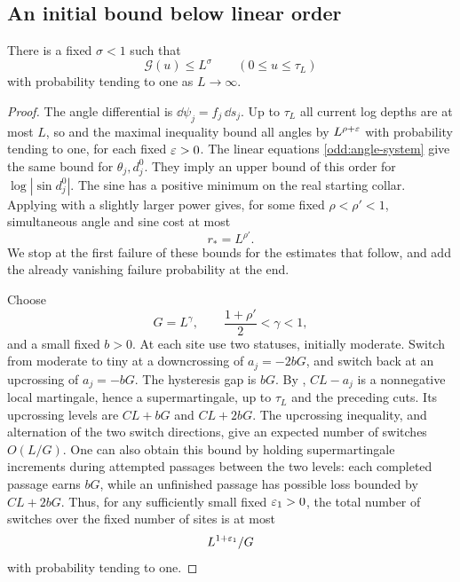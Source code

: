\subsection{An initial bound below linear order}

\begin{lemma}
\label{odd:initial-geometry}
There is a fixed \(\sigma<1\) such that
\[
 \mathcal G(u)\le L^\sigma\qquad(0\le u\le\tau_L)
\]
with probability tending to one as \(L\to\infty\).
\end{lemma}

\begin{proof}
The angle differential is \(\dd\psi_j=f_j\,\dd s_j\).  Up to \(\tau_L\)
all current log depths are at most \(L\), so
 and the maximal inequality bound all angles by
\(L^{\rho+\varepsilon}\) with probability tending to one, for each fixed
\(\varepsilon>0\).  The linear equations \eqref{odd:angle-system} give the same
bound for \(\theta_j,d_j^0\).  They imply an upper bound of this order for
\(\log|\sin d_j^0|\).  The sine has a positive minimum on the real
starting collar.  Applying  with a slightly larger
power gives, for some fixed \(\rho<\rho'<1\), simultaneous angle and sine
cost at most
\[
 r_*=L^{\rho'}.
\]
We stop at the first failure of these bounds for the estimates that follow,
and add the already vanishing failure probability at the end.

Choose
\[
 G=L^\gamma,\qquad \frac{1+\rho'}2<\gamma<1,
\]
and a small fixed \(b>0\).  At each site use two statuses, initially
moderate.  Switch from moderate to tiny at a downcrossing of
\(a_j=-2bG\), and switch back at an upcrossing of \(a_j=-bG\).
The hysteresis gap is \(bG\).  By ,
\(CL-a_j\) is a nonnegative local martingale, hence a supermartingale,
up to \(\tau_L\) and the preceding cuts. Its upcrossing levels are
\(CL+bG\) and \(CL+2bG\). The upcrossing inequality, and alternation
of the two switch directions, give an expected number of switches
\(O(L/G)\). One can also obtain this
bound by holding supermartingale increments during attempted passages
between the two levels: each completed passage earns \(bG\), while an
unfinished passage has possible loss bounded by \(CL+2bG\).
Thus, for any sufficiently small fixed \(\varepsilon_1>0\), the total number of
switches over the fixed number of sites is at most
\begin{equation}
 L^{1+\varepsilon_1}/G
 \label{odd:switch-count}
\end{equation}
with probability tending to one.


\end{proof}
